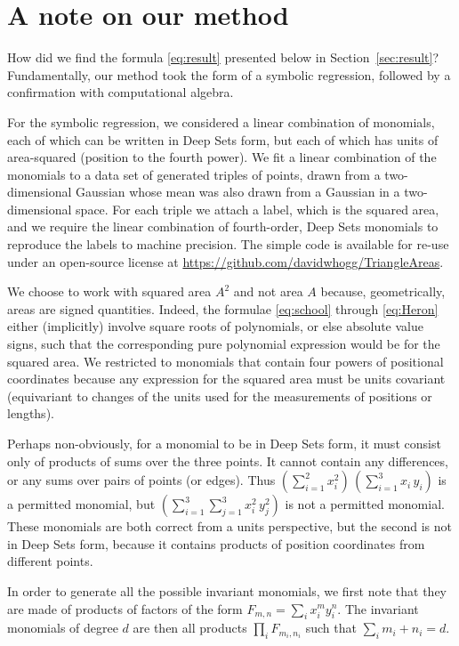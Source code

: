 \documentclass[12pt]{article}
\newcommand{\sectionname}{Section}
\newcommand{\secref}[1]{\sectionname~\ref{#1}}
\begin{document}
\section{A note on our method}\label{sec:method}
How did we find the formula \eqref{eq:result} presented below in \secref{sec:result}?
Fundamentally, our method took the form of a symbolic regression, followed by a confirmation with computational algebra.

For the symbolic regression, we considered a linear combination of monomials, each of which can be written in Deep Sets form, but each of which has units of area-squared (position to the fourth power).
We fit a linear combination of the monomials to a data set of generated triples of points, drawn from a two-dimensional Gaussian whose mean was also drawn from a Gaussian in a two-dimensional space.
For each triple we attach a label, which is the squared area, and we require the linear combination of fourth-order, Deep Sets monomials to reproduce the labels to machine precision.
The simple code is available for re-use under an open-source license at \url{https://github.com/davidwhogg/TriangleAreas}.

We choose to work with squared area $A^2$ and not area $A$ because, geometrically, areas are signed quantities.
Indeed, the formulae \eqref{eq:school} through \eqref{eq:Heron} either (implicitly) involve square roots of polynomials, or else absolute value signs, such that the corresponding pure polynomial expression would be for the squared area.
We restricted to monomials that contain four powers of positional coordinates because any expression for the squared area must be units covariant (equivariant to changes of the units used for the measurements of positions or lengths).

Perhaps non-obviously, for a monomial to be in Deep Sets form, it must consist only of products of sums over the three points.
It cannot contain any differences, or any sums over pairs of points (or edges).
Thus $(\sum_{i=1}^2 x_i^2)\,(\sum_{i=1}^3 x_i\,y_i)$ is a permitted monomial, but $(\sum_{i=1}^3\sum_{j=1}^3 x_i^2\,y_j^2)$ is not a permitted monomial.
These monomials are both correct from a units perspective, but the second is not in Deep Sets form, because it contains products of position coordinates from different points.

In order to generate all the possible invariant monomials, we first note that they are made of products of factors of the form $F_{m,n} = \sum_i x_i^m y_i^n$.
The invariant monomials of degree $d$ are then all products $\prod_i F_{m_i, n_i}$ such that $\sum_i m_i + n_i = d$.
\end{document}
